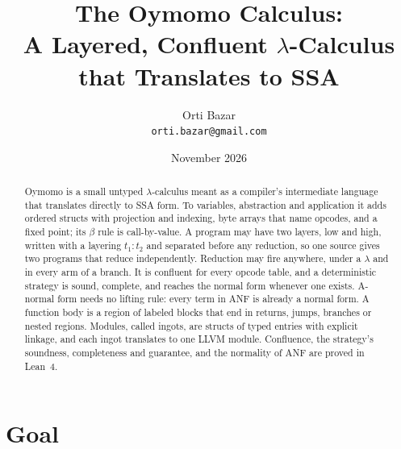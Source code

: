 \documentclass[11pt,letterpaper]{article}
\title{The Oymomo Calculus:\\A Layered, Confluent $\lambda$-Calculus that Translates to SSA}
\author{Orti Bazar\\ \texttt{orti.bazar@gmail.com}}
\date{November 2026}
\begin{document}
\maketitle

\begin{abstract}
Oymomo is a small untyped $\lambda$-calculus meant as a compiler's intermediate
language that translates directly to SSA form. To variables, abstraction and
application it adds ordered structs with projection and indexing, byte arrays
that name opcodes, and a fixed point; its $\beta$ rule is call-by-value. A
program may have two layers, low and high, written with a layering $t_1 : t_2$
and separated before any reduction, so one source gives two programs that
reduce independently. Reduction may fire anywhere, under a $\lambda$ and in
every arm of a branch. It is confluent for every opcode table, and a
deterministic strategy is sound, complete, and reaches the normal form whenever
one exists. A-normal form needs no lifting rule: every term in ANF is already a
normal form. A function body is a region of labeled blocks that end in returns,
jumps, branches or nested regions. Modules, called ingots, are structs of typed
entries with explicit linkage, and each ingot translates to one LLVM module.
Confluence, the strategy's soundness, completeness and guarantee, and the
normality of ANF are proved in Lean~4.
\end{abstract}


\section{Goal}\label{sec:goal}
\end{document}
